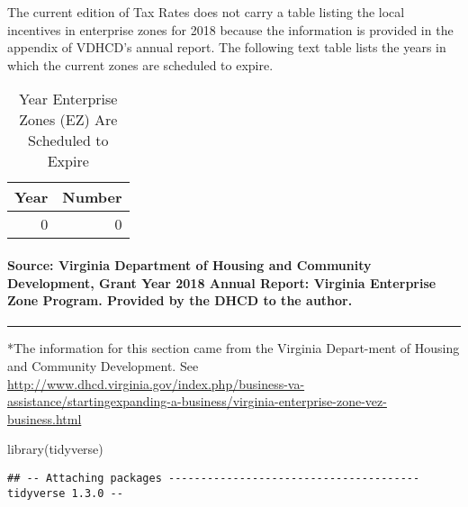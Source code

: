 \documentclass[
]{book}
\newenvironment{Shaded}{\begin{snugshade}}{\end{snugshade}}
\newcommand{\FunctionTok}[1]{\textcolor[rgb]{0.00,0.00,0.00}{#1}}
\newcommand{\NormalTok}[1]{#1}
\begin{document}
The current edition of Tax Rates does not carry a table listing the local incentives in enterprise zones for 2018 because the information is provided in the appendix of VDHCD's annual report. The following text table lists the years in which the current zones are scheduled to expire.

\begin{table}

\caption{\label{tab:unnamed-chunk-2}Year Enterprise Zones (EZ) Are Scheduled to Expire}
\centering
\begin{tabular}[t]{r|r}
\hline
Year & Number\\
\hline
0 & 0\\
\hline
\end{tabular}
\end{table}

\hypertarget{source-virginia-department-of-housing-and-community-development-grant-year-2018-annual-report-virginia-enterprise-zone-program.-provided-by-the-dhcd-to-the-author.}{%
\paragraph{Source: Virginia Department of Housing and Community Development, Grant Year 2018 Annual Report: Virginia Enterprise Zone Program. Provided by the DHCD to the author.}\label{source-virginia-department-of-housing-and-community-development-grant-year-2018-annual-report-virginia-enterprise-zone-program.-provided-by-the-dhcd-to-the-author.}}

\begin{center}\rule{0.5\linewidth}{0.5pt}\end{center}

*The information for this section came from the Virginia Depart-ment of Housing and Community Development. See \url{http://www.dhcd.virginia.gov/index.php/business-va-assistance/startingexpanding-a-business/virginia-enterprise-zone-vez-business.html}

\begin{Shaded}
\begin{Highlighting}[]
\FunctionTok{library}\NormalTok{(tidyverse)}
\end{Highlighting}
\end{Shaded}

\begin{verbatim}
## -- Attaching packages --------------------------------------- tidyverse 1.3.0 --
\end{verbatim}
\end{document}

